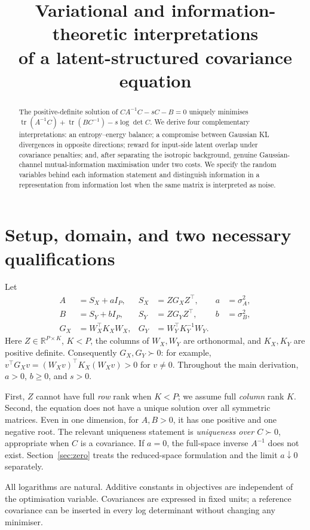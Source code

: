 \documentclass[11pt,a4paper]{article}
\title{Variational and information-theoretic interpretations\\of a latent-structured covariance equation}
\author{}
\date{}
\newcommand{\tr}{\operatorname{tr}}
\newcommand{\R}{\mathbb R}
\begin{document}
\maketitle
\begin{abstract}
The positive-definite solution of $CA^{-1}C-sC-B=0$ uniquely minimises
$\tr(A^{-1}C)+\tr(BC^{-1})-s\log\det C$.
We derive four complementary interpretations: an entropy--energy balance;
a compromise between Gaussian KL divergences in opposite directions;
reward for input-side latent overlap under covariance penalties; and,
after separating the isotropic background, genuine Gaussian-channel mutual-information maximisation under two costs.
We specify the random variables behind each information statement and distinguish information in a representation from information lost when the same matrix is interpreted as noise.
\end{abstract}

\section{Setup, domain, and two necessary qualifications}
Let
\begin{align}
 A&=S_X+aI_P,& S_X&=ZG_XZ^\top,& a&=\sigma_A^2,\\
 B&=S_Y+bI_P,& S_Y&=ZG_YZ^\top,& b&=\sigma_B^2,\\
 G_X&=W_X^\top K_XW_X,&
 G_Y&=W_Y^\top K_Y^{-1}W_Y.
\end{align}
Here $Z\in\R^{P\times K}$, $K<P$, the columns of $W_X,W_Y$ are orthonormal,
and $K_X,K_Y$ are positive definite. Consequently $G_X,G_Y\succ0$:
for example, $v^\top G_Xv=(W_Xv)^\top K_X(W_Xv)>0$ for $v\ne0$.
Throughout the main derivation, $a>0$, $b\ge0$, and $s>0$.

First, $Z$ cannot have full \emph{row} rank when $K<P$; we assume full
\emph{column} rank $K$. Second, the equation does not have a unique solution
over all symmetric matrices. Even in one dimension, for $A,B>0$, it has
one positive and one negative root. The relevant uniqueness statement is
\emph{uniqueness over $C\succ0$}, appropriate when $C$ is a covariance.
If $a=0$, the full-space inverse $A^{-1}$ does not exist. Section~\ref{sec:zero}
treats the reduced-space formulation and the limit $a\downarrow0$ separately.

All logarithms are natural. Additive constants in objectives are independent
of the optimisation variable. Covariances are expressed in fixed units;
a reference covariance can be inserted in every log determinant without
changing any minimiser.
\end{document}
